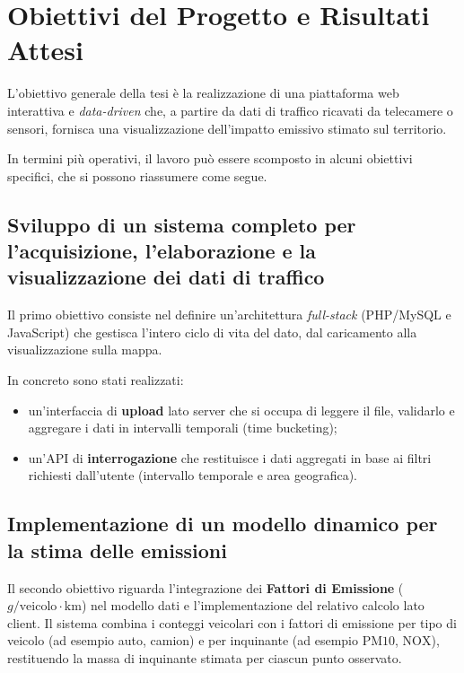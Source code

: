 \documentclass[12pt, oneside]{extbook}
\begin{document}
\section{Obiettivi del Progetto e Risultati Attesi}

L'obiettivo generale della tesi è la realizzazione di una piattaforma web interattiva e \emph{data-driven} che, a partire da dati di traffico ricavati da telecamere o sensori, fornisca una visualizzazione dell'impatto emissivo stimato sul territorio.

In termini più operativi, il lavoro può essere scomposto in alcuni obiettivi specifici, che si possono riassumere come segue.

\subsection{Sviluppo di un sistema completo per l'acquisizione, l'elaborazione e la visualizzazione dei dati di traffico}

Il primo obiettivo consiste nel definire un'architettura \emph{full-stack} (PHP/MySQL e JavaScript) che gestisca l'intero ciclo di vita del dato, dal caricamento alla visualizzazione sulla mappa.

In concreto sono stati realizzati:
\begin{itemize}
\item un'interfaccia di \textbf{upload} lato server che si occupa di leggere il file, validarlo e aggregare i dati in intervalli temporali (time bucketing);
\item un'API di \textbf{interrogazione} che restituisce i dati aggregati in base ai filtri richiesti dall'utente (intervallo temporale e area geografica).
\end{itemize}

\subsection{Implementazione di un modello dinamico per la stima delle emissioni}

Il secondo obiettivo riguarda l'integrazione dei \textbf{Fattori di Emissione} ($g/\text{veicolo} \cdot \text{km}$) nel modello dati e l'implementazione del relativo calcolo lato client.
Il sistema combina i conteggi veicolari con i fattori di emissione per tipo di veicolo (ad esempio auto, camion) e per inquinante (ad esempio $\text{PM}{10}$, $\text{NO}{\text{X}}$), restituendo la massa di inquinante stimata per ciascun punto osservato.
\end{document}
